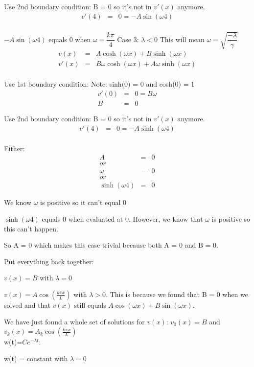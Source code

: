 \documentclass{article}
\newcommand{\bea}{\begin{eqnarray*}}
\newcommand{\eea}{\end{eqnarray*}}
\begin{document}
Use 2nd boundary condition: B = 0 so it's not in $v'(x)$ anymore.
\bea
v'(4) &=& 0 = -A\sin(\omega 4)\\
\eea

$-A\sin(\omega 4)$ equals 0 when $\omega = \dfrac{k\pi}{4}$ \newline
Case 3: $\lambda < 0$ This will mean $\omega=\sqrt{\dfrac{-\lambda}{\gamma}}$
\bea
v(x) &=& A\cosh(\omega x)+B\sinh(\omega x) \\
v'(x) &=& B\omega \cosh(\omega x)+A\omega \sinh(\omega x)  \\
\eea

Use 1st boundary condition: \newline
Note: sinh(0) = 0 and cosh(0) = 1
\bea
v'(0) &=& 0 = B\omega\\
B &=& 0
\eea

Use 2nd boundary condition: B = 0 so it's not in $v'(x)$ anymore.
\bea
v'(4) &=& 0 = -A\sinh(\omega 4)\\
\eea

Either:
\bea
A &=& 0 \\
or\\
\omega &=& 0 \\
or\\
\sinh(\omega 4) &=& 0
\eea

We know $\omega$ is positive so it can't equal 0\newline 

$\sinh(\omega 4)$ equals 0 when evaluated at 0. However, we know that $\omega$ is positive so this can't happen. \newline

So A = 0 which makes this case trivial because both A = 0 and B = 0. \newline 

Put everything back together:

$v(x) = B$ with $\lambda=0$\newline 

$v(x) = A\cos\left(\frac{k \pi x}{L}\right)$ with $\lambda > 0$.  This is because we found that B = 0 when we solved and that $v(x)$ still equals $A\cos(\omega x)+B\sin(\omega x)$.  \newline

We have just found a whole set of solutions for $v(x)$: $v_0(x) = B$ and $v_k(x) = A_k\cos\left(\frac{k\pi x}{L}\right)$\\

w(t)=$Ce^{-\lambda t}$:

w(t) = constant with  $\lambda = 0$
\end{document}
